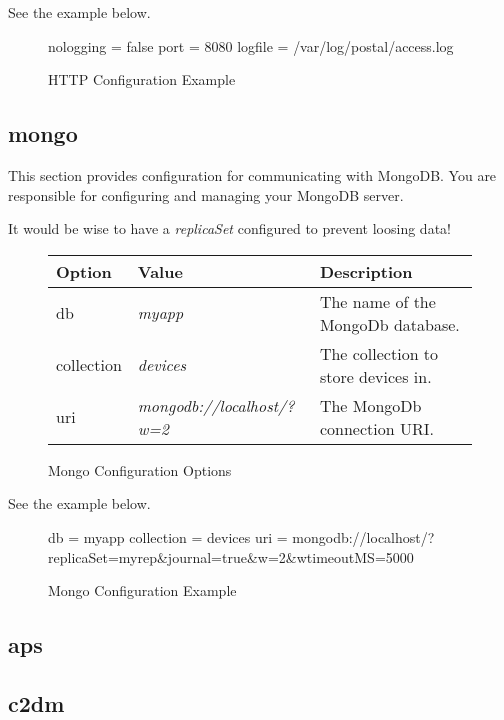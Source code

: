 \documentclass[12pt]{article}
\begin{document}
See the example below.

\begin{figure}[h!]
\begin{Terminal}
[http]
nologging = false
port = 8080
logfile = /var/log/postal/access.log
\end{Terminal}
\caption{HTTP Configuration Example}
\end{figure}

\subsection{mongo}

This section provides configuration for communicating with MongoDB.
You are responsible for configuring and managing your MongoDB server.

It would be wise to have a \emph{replicaSet} configured to prevent loosing data!

\begin{figure}[h!]
\centering
\begin{tabular}{l l l}
\hline
Option & Value & Description \\
\hline
db & \emph{myapp} & The name of the MongoDb database. \\
collection & \emph{devices} & The collection to store devices in. \\
uri & \emph{\small mongodb://localhost/?w=2} & The MongoDb connection URI. \\
\hline
\end{tabular}
\caption{Mongo Configuration Options}
\end{figure}

See the example below.

\begin{figure}[h!]
\begin{Terminal}
[mongo]
db = myapp
collection = devices
uri = mongodb://localhost/?replicaSet=myrep&journal=true&w=2&wtimeoutMS=5000
\end{Terminal}
\caption{Mongo Configuration Example}
\end{figure}

\subsection{aps}

\subsection{c2dm}
\end{document}
